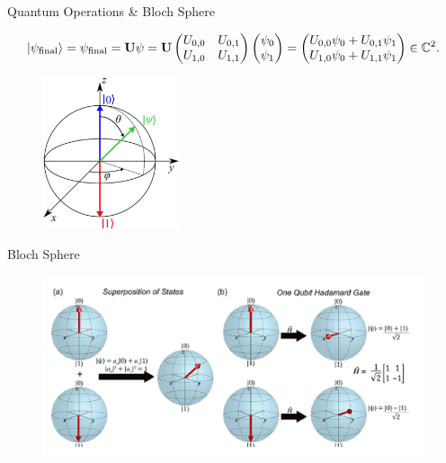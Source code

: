 \documentclass[10pt]{beamer}
\begin{document}
\begin{frame}{Quantum Operations \& Bloch Sphere}

\begin{equation*}
    \ket{\psi_{\text{final}}} = \psi_{\text{final}} = \mathbf{U} \psi = \mathbf{U} \begin{pmatrix}
    U_{0,0} & U_{0,1} \\
    U_{1,0} & U_{1,1}
    \end{pmatrix} \begin{pmatrix}
    \psi_0 \\
    \psi_1
    \end{pmatrix} = \begin{pmatrix}
    U_{0,0}\psi_0 + U_{0,1}\psi_1 \\
    U_{1,0}\psi_0 + U_{1,1}\psi_1
    \end{pmatrix} \in \mathbb{C}^2.
\end{equation*}



\begin{figure}
    \centering
    \includegraphics[width=4cm]{images/Bloch-sphere-representation-of-a-qubit.png}
    \label{fig:enter-label}
\end{figure}
    
\end{frame}

\begin{frame}{Bloch Sphere}

\begin{figure}
    \hspace*{-1.1cm}
    \centering
    \includegraphics[width=13cm]{images/bloch-hadamard-gate.png}
    \label{fig:enter-label}
\end{figure}
    
\end{frame}
\end{document}
